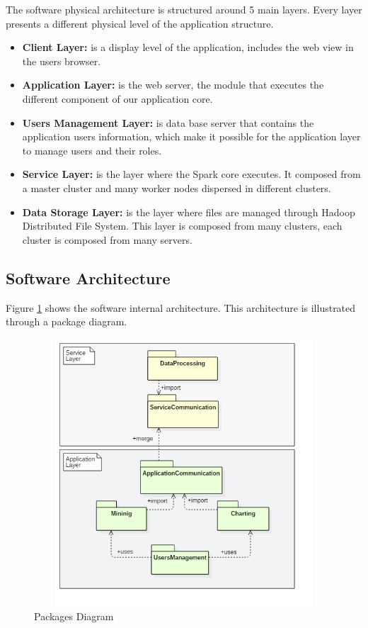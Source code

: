 The software physical architecture is structured around 5 main layers. Every layer presents a different physical level of the application structure.
\begin{itemize}
\item \textbf{Client Layer:} is a display level of the application, includes the web view in the users browser.\\ 
\item \textbf{Application Layer:} is the web server, the module that executes the different component of our application core.\\
\item \textbf{Users Management Layer:} is data base server that contains the application users information, which make it possible for the application layer to manage users and their roles.\\
\item \textbf{Service Layer:} is the layer where the Spark core executes. It composed from a master cluster and many worker nodes dispersed in different clusters.\\
\item \textbf{Data Storage Layer:} is the layer where files are managed through Hadoop Distributed File System. This layer is composed from many clusters, each cluster is composed from many servers.\\
\end{itemize}
\subsection{Software Architecture}

Figure \ref{package} shows the software internal architecture. This architecture is illustrated through a package diagram.\\

\begin{figure}[!ht]
\begin{center}
\includegraphics[width=15cm,height=10cm]{chapter4/package.png}
\end{center}
\caption{Packages Diagram}
\label{package}
\end{figure}


